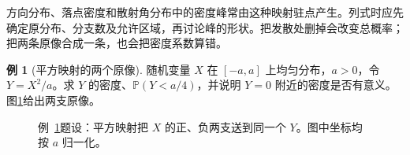 \documentclass[11pt,openany,fontset=fandol]{ctexbook}
\theoremstyle{definition}\newtheorem{example}{例}[chapter]\newtheorem{exercise}{习题}[chapter]
\newcommand{\Prob}{\mathbb P}\newcommand{\avg}[1]{\left\langle#1\right\rangle}
\begin{document}
方向分布、落点密度和散射角分布中的密度峰常由这种映射驻点产生。列式时应先确定原分布、分支数及允许区域，再讨论峰的形状。把发散处删掉会改变总概率；把两条原像合成一条，也会把密度系数算错。

\par\medskip\noindent\begin{minipage}{\textwidth}
\begin{example}[平方映射的两个原像]\label{mp1:ex:e1}
随机变量 $X$ 在 $[-a,a]$ 上均匀分布，$a>0$，令 $Y=X^2/a$。求 $Y$ 的密度、$\Prob(Y<a/4)$，并说明 $Y=0$ 附近的密度是否有意义。图\ref{mp1:fig:e1-q}给出两支原像。
\end{example}

\begin{figure}[H]\centering

\caption{例~\ref{mp1:ex:e1}题设：平方映射把 $X$ 的正、负两支送到同一个 $Y$。图中坐标均按 $a$ 归一化。}\label{mp1:fig:e1-q}
\end{figure}

\end{minipage}\par\medskip
\end{document}
